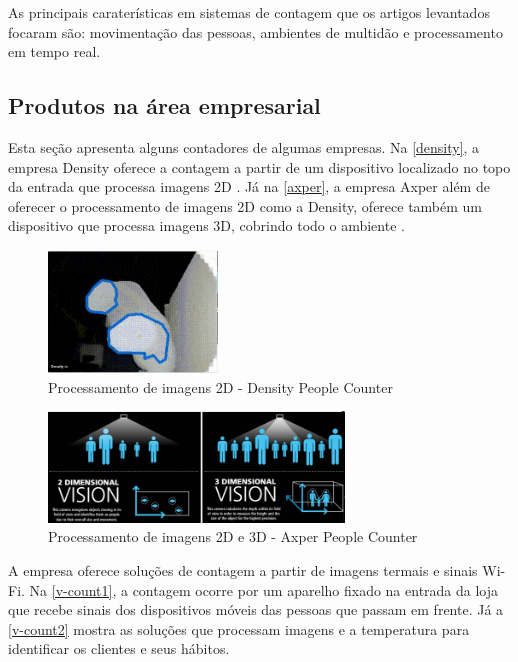   As principais caraterísticas em sistemas de contagem que os artigos levantados focaram são: movimentação das pessoas, ambientes de multidão e processamento em tempo real.

\subsection{Produtos na área empresarial}
\label{produtos-empresas}
Esta seção apresenta alguns contadores de algumas empresas. Na \autoref{density}, a empresa Density oferece a contagem a partir de um
dispositivo localizado no topo da entrada que processa imagens 2D \cite{Density2017}. Já na \autoref{axper}, a empresa Axper além de oferecer
o processamento de imagens 2D como a Density, oferece também um dispositivo que processa imagens 3D, cobrindo todo o ambiente \cite{Axper2017}.

\begin{figure}[htb]
  \caption{\label{density}Processamento de imagens 2D - Density People Counter}
  \begin{center}
    \includegraphics[width=0.40\textwidth]{img/density.png}
  \end{center}
\end{figure}

\begin{figure}[htb]
  \caption{\label{axper}Processamento de imagens 2D e 3D - Axper People Counter}
  \begin{center}
    \includegraphics[width=0.70\textwidth]{img/axper.png}
  \end{center}
\end{figure}

A empresa  oferece soluções de contagem a partir de imagens termais e sinais Wi-Fi. Na \autoref{v-count1}, a contagem ocorre por um
aparelho fixado na entrada da loja que recebe sinais dos dispositivos móveis das pessoas que passam em frente. Já a \autoref{v-count2}
mostra as soluções que processam imagens e a temperatura para identificar os clientes e seus hábitos.


